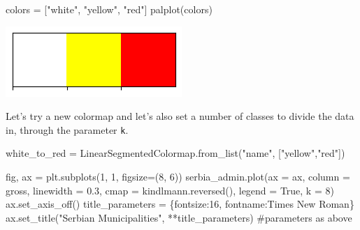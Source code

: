 \documentclass[
  letterpaper,
  DIV=11,
  numbers=noendperiod]{scrreprt}
\newenvironment{Shaded}{\begin{snugshade}}{\end{snugshade}}
\newcommand{\BuiltInTok}[1]{\textcolor[rgb]{0.00,0.23,0.31}{#1}}
\newcommand{\CommentTok}[1]{\textcolor[rgb]{0.37,0.37,0.37}{#1}}
\newcommand{\DecValTok}[1]{\textcolor[rgb]{0.68,0.00,0.00}{#1}}
\newcommand{\FloatTok}[1]{\textcolor[rgb]{0.68,0.00,0.00}{#1}}
\newcommand{\NormalTok}[1]{\textcolor[rgb]{0.00,0.23,0.31}{#1}}
\newcommand{\OperatorTok}[1]{\textcolor[rgb]{0.37,0.37,0.37}{#1}}
\newcommand{\StringTok}[1]{\textcolor[rgb]{0.13,0.47,0.30}{#1}}
\newcommand{\VariableTok}[1]{\textcolor[rgb]{0.07,0.07,0.07}{#1}}
\begin{document}
\begin{Shaded}
\begin{Highlighting}[]
\NormalTok{colors }\OperatorTok{=}\NormalTok{ [}\StringTok{"white"}\NormalTok{, }\StringTok{"yellow"}\NormalTok{, }\StringTok{"red"}\NormalTok{]}
\NormalTok{palplot(colors)}
\end{Highlighting}
\end{Shaded}

\includegraphics{labs/w02_maps_files/figure-pdf/cell-31-output-1.png}

Let's try a new colormap and let's also set a number of classes to
divide the data in, through the parameter \texttt{k}.

\begin{Shaded}
\begin{Highlighting}[]
\NormalTok{white\_to\_red }\OperatorTok{=}\NormalTok{ LinearSegmentedColormap.from\_list(}\StringTok{"name"}\NormalTok{, [}\StringTok{"yellow"}\NormalTok{,}\StringTok{"red"}\NormalTok{])}
\end{Highlighting}
\end{Shaded}

\begin{Shaded}
\begin{Highlighting}[]
\NormalTok{fig, ax }\OperatorTok{=}\NormalTok{ plt.subplots(}\DecValTok{1}\NormalTok{, }\DecValTok{1}\NormalTok{, figsize}\OperatorTok{=}\NormalTok{(}\DecValTok{8}\NormalTok{, }\DecValTok{6}\NormalTok{))}
\NormalTok{serbia\_admin.plot(ax }\OperatorTok{=}\NormalTok{ ax, column }\OperatorTok{=} \StringTok{\textquotesingle{}gross\textquotesingle{}}\NormalTok{, linewidth }\OperatorTok{=} \FloatTok{0.3}\NormalTok{, cmap }\OperatorTok{=}\NormalTok{ kindlmann.}\BuiltInTok{reversed}\NormalTok{(), legend }\OperatorTok{=} \VariableTok{True}\NormalTok{, k }\OperatorTok{=} \DecValTok{8}\NormalTok{)}
\NormalTok{ax.set\_axis\_off()}
\NormalTok{title\_parameters }\OperatorTok{=}\NormalTok{ \{}\StringTok{\textquotesingle{}fontsize\textquotesingle{}}\NormalTok{:}\StringTok{\textquotesingle{}16\textquotesingle{}}\NormalTok{, }\StringTok{\textquotesingle{}fontname\textquotesingle{}}\NormalTok{:}\StringTok{\textquotesingle{}Times New Roman\textquotesingle{}}\NormalTok{\}}
\NormalTok{ax.set\_title(}\StringTok{"Serbian Municipalities"}\NormalTok{, }\OperatorTok{**}\NormalTok{title\_parameters) }\CommentTok{\#parameters as above}
\end{Highlighting}
\end{Shaded}
\end{document}
